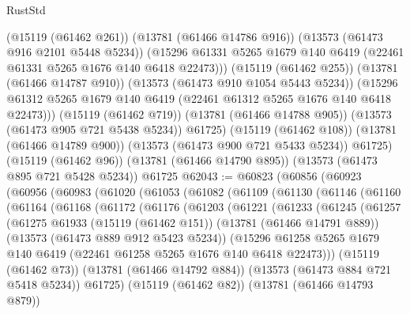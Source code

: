\begin{lexlean}{RustStd}
\begin{coremodule}
            (@15119 (@61462 @261))
            (@13781 (@61466 @14786 @916))
            (@13573 (@61473 @916 @2101 @5448 @5234))
            (@15296 @61331 @5265 @1679 @140 @6419 (@22461 @61331 @5265 @1676 @140 @6418 @22473)))
          (@15119 (@61462 @255))
          (@13781 (@61466 @14787 @910))
          (@13573 (@61473 @910 @1054 @5443 @5234))
          (@15296 @61312 @5265 @1679 @140 @6419 (@22461 @61312 @5265 @1676 @140 @6418 @22473)))
        (@15119 (@61462 @719))
        (@13781 (@61466 @14788 @905))
        (@13573 (@61473 @905 @721 @5438 @5234))
        @61725)
      (@15119 (@61462 @108))
      (@13781 (@61466 @14789 @900))
      (@13573 (@61473 @900 @721 @5433 @5234))
      @61725)
    (@15119 (@61462 @96))
    (@13781 (@61466 @14790 @895))
    (@13573 (@61473 @895 @721 @5428 @5234))
    @61725
@62043 := @60823
    (@60856
      (@60923
        (@60956
          (@60983
            (@61020
              (@61053
                (@61082
                  (@61109
                    (@61130
                      (@61146
                        (@61160
                          (@61164
                            (@61168
                              (@61172
                                (@61176
                                  (@61203
                                    (@61221
                                      (@61233
                                        (@61245
                                          (@61257
                                            (@61275
                                              @61933
                                              (@15119 (@61462 @151))
                                              (@13781 (@61466 @14791 @889))
                                              (@13573 (@61473 @889 @912 @5423 @5234))
                                              (@15296
                                                @61258
                                                @5265
                                                @1679
                                                @140
                                                @6419
                                                (@22461 @61258 @5265 @1676 @140 @6418 @22473)))
                                            (@15119 (@61462 @73))
                                            (@13781 (@61466 @14792 @884))
                                            (@13573 (@61473 @884 @721 @5418 @5234))
                                            @61725)
                                          (@15119 (@61462 @82))
                                          (@13781 (@61466 @14793 @879))

\end{coremodule}
\end{lexlean}
